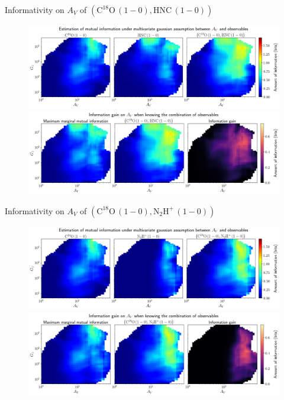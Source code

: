 \documentclass{beamer}
\begin{document}
\begin{frame}{Informativity on $A_V$ of $\left(\mathrm{C^{18}O\,(1-0)},\mathrm{HNC\,(1-0)}\right)$}
    \begin{figure}
        \centering
        \includegraphics[width=0.95\linewidth]{../linearinfogauss/av__c18o10_hnc10_linearinfogauss.png}
        \vfill
        \includegraphics[width=0.95\linewidth]{../linearinfogauss/av__c18o10_hnc10_linearinfogauss_gain.png}
    \end{figure}
\end{frame}

\begin{frame}{Informativity on $A_V$ of $\left(\mathrm{C^{18}O\,(1-0)},\mathrm{N_2H^+\,(1-0)}\right)$}
    \begin{figure}
        \centering
        \includegraphics[width=0.95\linewidth]{../linearinfogauss/av__c18o10_n2hp10_linearinfogauss.png}
        \vfill
        \includegraphics[width=0.95\linewidth]{../linearinfogauss/av__c18o10_n2hp10_linearinfogauss_gain.png}
    \end{figure}
\end{frame}
\end{document}
